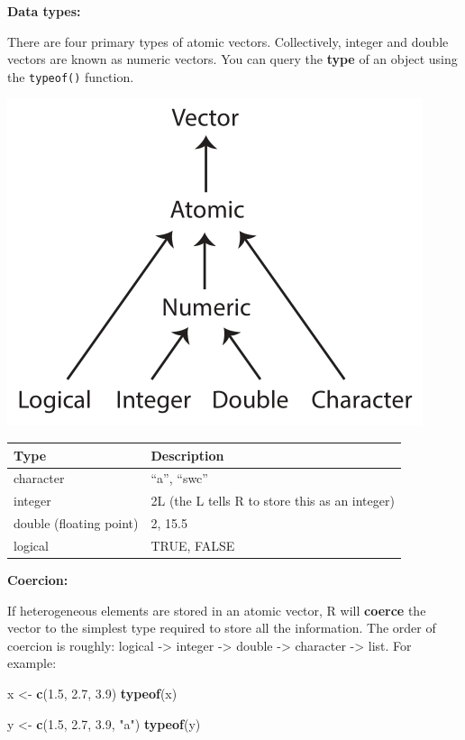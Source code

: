 \documentclass[]{book}
\newenvironment{Shaded}{\begin{snugshade}}{\end{snugshade}}
\newcommand{\KeywordTok}[1]{\textcolor[rgb]{0.13,0.29,0.53}{\textbf{#1}}}
\newcommand{\FloatTok}[1]{\textcolor[rgb]{0.00,0.00,0.81}{#1}}
\newcommand{\StringTok}[1]{\textcolor[rgb]{0.31,0.60,0.02}{#1}}
\newcommand{\NormalTok}[1]{#1}
\begin{document}
\textbf{Data types:}

There are four primary types of atomic vectors. Collectively, integer
and double vectors are known as numeric vectors. You can query the
\textbf{type} of an object using the \texttt{typeof()} function.

\includegraphics{R/RDataWrangling/images/summary_tree_atomic.png}

\begin{longtable}[]{@{}ll@{}}
\toprule
Type & Description\tabularnewline
\midrule
\endhead
character & ``a'', ``swc''\tabularnewline
integer & 2L (the L tells R to store this as an integer)\tabularnewline
double (floating point) & 2, 15.5\tabularnewline
logical & TRUE, FALSE\tabularnewline
\bottomrule
\end{longtable}

\textbf{Coercion:}

If heterogeneous elements are stored in an atomic vector, R will
\textbf{coerce} the vector to the simplest type required to store all
the information. The order of coercion is roughly: logical
-\textgreater{} integer -\textgreater{} double -\textgreater{} character
-\textgreater{} list. For example:

\begin{Shaded}
\begin{Highlighting}[]
\NormalTok{x <-}\StringTok{ }\KeywordTok{c}\NormalTok{(}\FloatTok{1.5}\NormalTok{, }\FloatTok{2.7}\NormalTok{, }\FloatTok{3.9}\NormalTok{)}
\KeywordTok{typeof}\NormalTok{(x)}

\NormalTok{y <-}\StringTok{ }\KeywordTok{c}\NormalTok{(}\FloatTok{1.5}\NormalTok{, }\FloatTok{2.7}\NormalTok{, }\FloatTok{3.9}\NormalTok{, }\StringTok{"a"}\NormalTok{)}
\KeywordTok{typeof}\NormalTok{(y)}
\end{Highlighting}
\end{Shaded}
\end{document}
